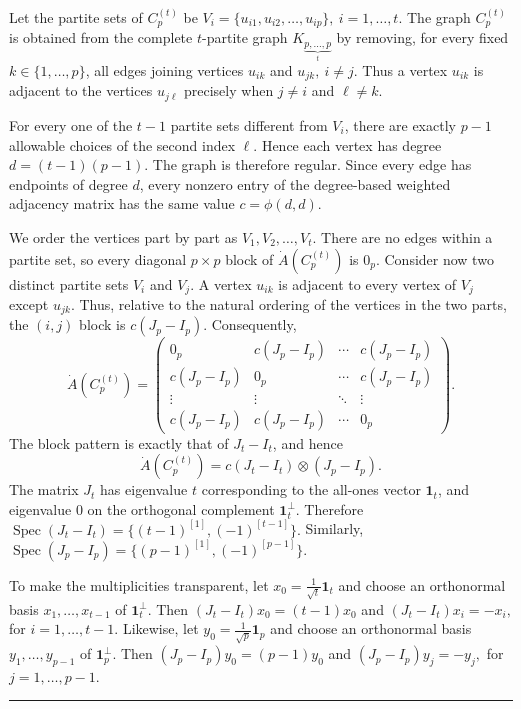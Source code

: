 \documentclass[12pt,twoside]{article}
\renewenvironment{proof}{{\noindent\bfseries Proof.}}{\qed}
\newcommand{\spec}{\operatorname{Spec}}
\def\qed{\nolinebreak\hfill\rule{.2cm}{.2cm}\par\addvspace{.5cm}}
\begin{document}
\begin{proof}
	Let the partite sets of $C_p^{(t)}$ be
	$
	V_i=\{u_{i1},u_{i2},\ldots,u_{ip}\},~ i=1,\ldots,t.
	$
	The graph $C_p^{(t)}$ is obtained from the complete $t$-partite graph
	$
	K_{\underbrace{p,\ldots,p}_{t}}
	$
	by removing, for every fixed $k\in\{1,\ldots,p\}$, all edges joining vertices
	$u_{ik}$ and $u_{jk},~ i\neq j.$
	Thus a vertex $u_{ik}$ is adjacent to the vertices $u_{j\ell}$ precisely when
	$
	j\neq i
	$ and $
	\ell\neq k.
	$
	 
	For every one of the $t-1$ partite sets different from $V_i$, there are exactly $p-1$ allowable choices of the second index $\ell$. Hence each vertex has degree
	$
	d=(t-1)(p-1).
	$
	The graph is therefore regular. Since every edge has endpoints of degree $d$, every nonzero entry of the degree-based weighted adjacency matrix has the same value
	$
	c=\phi(d,d).
	$
	
	We order the vertices part by part as
	$
	V_1,V_2,\ldots,V_t.
	$
	There are no edges within a partite set, so every diagonal $p\times p$ block of $\dot A(C_p^{(t)})$ is $0_p$. Consider now two distinct partite sets $V_i$ and $V_j$. A vertex $u_{ik}$ is adjacent to every vertex of $V_j$ except $u_{jk}$. Thus, relative to the natural ordering of the vertices in the two parts, the $(i,j)$ block is
	$
	c(J_p-I_p).
	$
	Consequently,
	$$
	\dot A(C_p^{(t)})
	=
	\begin{pmatrix}
		0_p & c(J_p-I_p) & \cdots & c(J_p-I_p)\\
		c(J_p-I_p) & 0_p & \cdots & c(J_p-I_p)\\
		\vdots & \vdots & \ddots & \vdots\\
		c(J_p-I_p) & c(J_p-I_p) & \cdots & 0_p
	\end{pmatrix}.
	$$
	 The block pattern is exactly that of $J_t-I_t$, and hence
	$$
	\dot A(C_p^{(t)})
	=
	c(J_t-I_t)\otimes(J_p-I_p).
	$$
	 The matrix $J_t$ has eigenvalue $t$ corresponding to the all-ones vector $\mathbf 1_t$, and eigenvalue $0$ on the orthogonal complement $\mathbf 1_t^\perp$. Therefore
	$
	\spec(J_t-I_t)
	=
	\{(t-1)^{[1]},(-1)^{[t-1]}\}.
	$
	Similarly,
	$
	\spec(J_p-I_p)
	=
	\{(p-1)^{[1]},(-1)^{[p-1]}\}.
	$
	
	To make the multiplicities transparent, let
	$
	x_0=\tfrac{1}{\sqrt t}\mathbf 1_t
	$
	and choose an orthonormal basis
	$
	x_1,\ldots,x_{t-1}
	$
	of $\mathbf 1_t^\perp$. Then
	$
	(J_t-I_t)x_0=(t-1)x_0
	$
	and
	$
	(J_t-I_t)x_i=-x_i,
	$ for $ i=1,\ldots,t-1.
	$
	Likewise, let
	$
	y_0=\tfrac{1}{\sqrt p}\mathbf 1_p
	$
	and choose an orthonormal basis
	$
	y_1,\ldots,y_{p-1}
	$
	of $\mathbf 1_p^\perp$. Then
	$
	(J_p-I_p)y_0=(p-1)y_0
	$
	and
	$
	(J_p-I_p)y_j=-y_j,$ for $j=1,\ldots,p-1.
	$
	

\end{proof}
\end{document}

